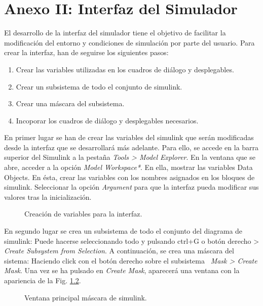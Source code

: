 \documentclass{report}
\begin{document}
\chapter{Anexo II: Interfaz del Simulador} \label{sec.anexo2}

El desarrollo de la interfaz del simulador tiene el objetivo de facilitar la modificación del entorno y condiciones de simulación por parte del usuario. Para crear la interfaz, han de seguirse los siguientes pasos:
\begin{enumerate}
    \item Crear las variables utilizadas en los cuadros de diálogo y desplegables.
    \item Crear un subsistema de todo el conjunto de simulink.
    \item Crear una máscara del subsistema.
    \item Incoporar los cuadros de diálogo y desplegables necesarios.
\end{enumerate}

En primer lugar se han de crear las variables del simulink que serán modificadas desde la interfaz que se desarrollará más adelante. Para ello, se accede en la barra superior del Simulink a la pestaña \textit{Tools > Model Explorer}. En la ventana que se abre, acceder a la opción \textit{Model Workspace*}. En ella, mostrar las variables Data Objects. En ésta, crear las variables con los nombres asignados en los bloques de simulink. Seleccionar la opción \textit{Argument} para que la interfaz pueda modificar sus valores tras la inicialización.

\begin{figure}[!h]
    \begin{center}
    \caption{Creación de variables para la interfaz.}
    \label{fig.mask5} 
    \end{center}
\end{figure}

En segundo lugar se crea un subsistema de todo el conjunto del diagrama de simulink: Puede hacerse seleccionando todo y pulsando ctrl+G o botón derecho > \textit{Create Subsystem from Selection}. A continuación, se crea una máscara del sistema: Haciendo click con el botón derecho sobre el subsistema \textit{ Mask > Create Mask}. Una vez se ha pulsado en \textit{Create Mask}, aparecerá una ventana con la apariencia de la Fig. \ref{fig.mask1}.
\begin{figure}[!h]
    \begin{center}
    \caption{Ventana principal máscara de simulink.}
    \label{fig.mask1} 
    \end{center}
\end{figure}
\end{document}
